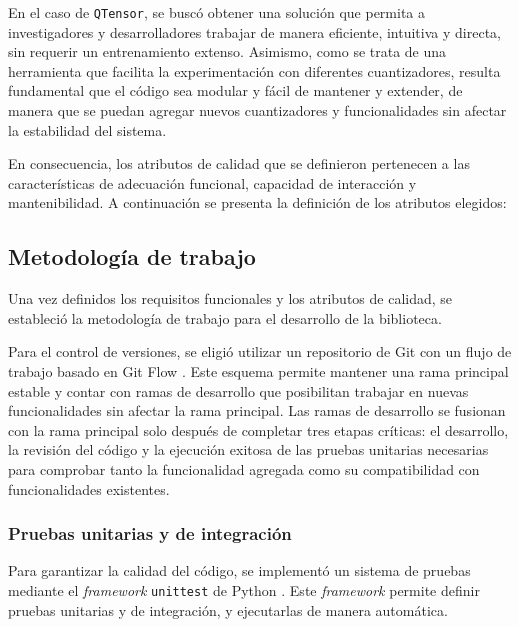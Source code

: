
En el caso de \texttt{QTensor}, se buscó obtener una solución que permita a investigadores y desarrolladores trabajar de manera eficiente, intuitiva y directa, sin requerir un entrenamiento extenso. Asimismo, como se trata de una herramienta que facilita la experimentación con diferentes cuantizadores, resulta fundamental que el código sea modular y fácil de mantener y extender, de manera que se puedan agregar nuevos cuantizadores y funcionalidades sin afectar la estabilidad del sistema.

En consecuencia, los atributos de calidad que se definieron pertenecen a las características de adecuación funcional, capacidad de interacción y mantenibilidad. A continuación se presenta la definición de los atributos elegidos:



\subsection{Metodología de trabajo}

Una vez definidos los requisitos funcionales y los atributos de calidad, se estableció la metodología de trabajo para el desarrollo de la biblioteca.

Para el control de versiones, se eligió utilizar un repositorio de Git \cite{torvalds2005git} con un flujo de trabajo basado en Git Flow \cite{driessen2010gitflow}. Este esquema permite mantener una rama principal estable y contar con ramas de desarrollo que posibilitan trabajar en nuevas funcionalidades sin afectar la rama principal. Las ramas de desarrollo se fusionan con la rama principal solo después de completar tres etapas críticas: el desarrollo, la revisión del código y la ejecución exitosa de las pruebas unitarias necesarias para comprobar tanto la funcionalidad agregada como su compatibilidad con funcionalidades existentes.

\subsubsection{Pruebas unitarias y de integración}
\label{sec:testing}
Para garantizar la calidad del código, se implementó un sistema de pruebas mediante el \textit{framework} \texttt{unittest} de Python \cite{python_unittest}. Este \textit{framework} permite definir pruebas unitarias y de integración, y ejecutarlas de manera automática.

